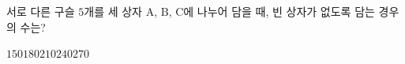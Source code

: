 서로 다른 구슬 $5$개를 세 상자 $\mathrm{A}$, $\mathrm{B}$, $\mathrm{C}$에 나누어 담을 때, 빈 상자가 없도록 담는 경우의 수는?
\begin{choices32}{$150$}{$180$}{$210$}{$240$}{$270$}\end{choices32}
